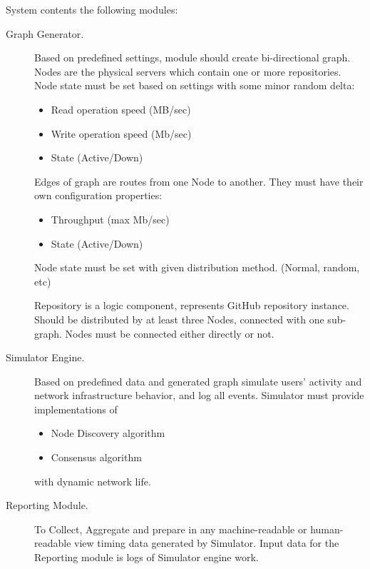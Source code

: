 \documentclass[12pt,oneside]{article}
\begin{document}
                      System contents the following modules:
                      \begin{description}
                          \item[Graph Generator.]
                          Based on predefined settings, module should create bi-directional graph. Nodes are the physical servers which contain one or more repositories. Node state must be set based on settings with some minor random delta:
                          \begin{itemize}
                              \item Read operation speed (MB/sec)
                              \item Write operation speed (Mb/sec)
                              \item State (Active/Down)
                          \end{itemize}
                          Edges of graph are routes from one Node to another. They must have their own configuration properties:
                          \begin{itemize}
                              \item Throughput (max Mb/sec)
                              \item State (Active/Down)
                          \end{itemize}
                          Node state must be set with given distribution method. (Normal, random, etc)\par
                          Repository is a logic component, represents GitHub repository instance. Should be distributed by at least three Nodes, connected with one sub-graph. Nodes must be connected either directly or not.

                          \item[Simulator Engine.]
                          Based on predefined data and generated graph simulate users' activity and network infrastructure behavior, and log all events. Simulator must provide implementations of
                          \begin{itemize}
                              \item Node Discovery algorithm
                              \item Consensus algorithm
                          \end{itemize}
                          with dynamic network life.

                          \item[Reporting Module.]
                          To Collect, Aggregate and prepare in any machine-readable or human-readable view timing data generated by Simulator. Input data for the Reporting module is logs of Simulator engine work.

                      \end{description}

                      \printbibliography%
                      
\end{document}
